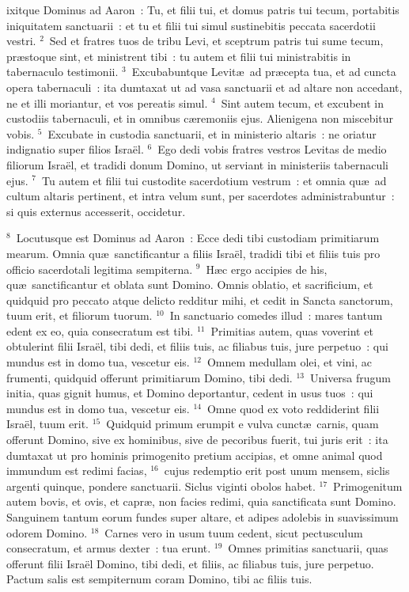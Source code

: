 \bchapter
{}ixitque Dominus ad Aaron~: Tu, et filii tui, et domus patris tui tecum, portabitis iniquitatem sanctuarii~: et tu et filii tui simul sustinebitis peccata sacerdotii vestri.
${}^{2}$~Sed et fratres tuos de tribu Levi, et sceptrum patris tui sume tecum, pr\ae stoque sint, et ministrent tibi~: tu autem et filii tui ministrabitis in tabernaculo testimonii.
${}^{3}$~Excubabuntque Levit\ae\ ad pr\ae cepta tua, et ad cuncta opera tabernaculi~: ita dumtaxat ut ad vasa sanctuarii et ad altare non accedant, ne et illi moriantur, et vos pereatis simul.
${}^{4}$~Sint autem tecum, et excubent in custodiis tabernaculi, et in omnibus c\ae remoniis ejus. Alienigena non miscebitur vobis.
${}^{5}$~Excubate in custodia sanctuarii, et in ministerio altaris~: ne oriatur indignatio super filios Isra\"el.
${}^{6}$~Ego dedi vobis fratres vestros Levitas de medio filiorum Isra\"el, et tradidi donum Domino, ut serviant in ministeriis tabernaculi ejus.
${}^{7}$~Tu autem et filii tui custodite sacerdotium vestrum~: et omnia qu\ae\ ad cultum altaris pertinent, et intra velum sunt, per sacerdotes administrabuntur~: si quis externus accesserit, occidetur.


${}^{8}$~Locutusque est Dominus ad Aaron~: Ecce dedi tibi custodiam primitiarum mearum. Omnia qu\ae\ sanctificantur a filiis Isra\"el, tradidi tibi et filiis tuis pro officio sacerdotali legitima sempiterna.
${}^{9}$~H\ae c ergo accipies de his, qu\ae\ sanctificantur et oblata sunt Domino. Omnis oblatio, et sacrificium, et quidquid pro peccato atque delicto redditur mihi, et cedit in Sancta sanctorum, tuum erit, et filiorum tuorum.
${}^{10}$~In sanctuario comedes illud~: mares tantum edent ex eo, quia consecratum est tibi.
${}^{11}$~Primitias autem, quas voverint et obtulerint filii Isra\"el, tibi dedi, et filiis tuis, ac filiabus tuis, jure perpetuo~: qui mundus est in domo tua, vescetur eis.
${}^{12}$~Omnem medullam olei, et vini, ac frumenti, quidquid offerunt primitiarum Domino, tibi dedi.
${}^{13}$~Universa frugum initia, quas gignit humus, et Domino deportantur, cedent in usus tuos~: qui mundus est in domo tua, vescetur eis.
${}^{14}$~Omne quod ex voto reddiderint filii Isra\"el, tuum erit.
${}^{15}$~Quidquid primum erumpit e vulva cunct\ae\ carnis, quam offerunt Domino, sive ex hominibus, sive de pecoribus fuerit, tui juris erit~: ita dumtaxat ut pro hominis primogenito pretium accipias, et omne animal quod immundum est redimi facias,
${}^{16}$~cujus redemptio erit post unum mensem, siclis argenti quinque, pondere sanctuarii. Siclus viginti obolos habet.
${}^{17}$~Primogenitum autem bovis, et ovis, et capr\ae , non facies redimi, quia sanctificata sunt Domino. Sanguinem tantum eorum fundes super altare, et adipes adolebis in suavissimum odorem Domino.
${}^{18}$~Carnes vero in usum tuum cedent, sicut pectusculum consecratum, et armus dexter~: tua erunt.
${}^{19}$~Omnes primitias sanctuarii, quas offerunt filii Isra\"el Domino, tibi dedi, et filiis, ac filiabus tuis, jure perpetuo. Pactum salis est sempiternum coram Domino, tibi ac filiis tuis.


